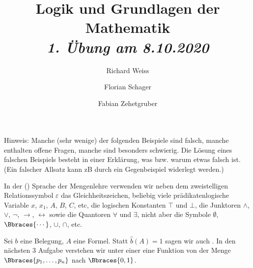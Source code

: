 \documentclass{article}
\title
{
  Logik und Grundlagen der Mathematik \\
  \vspace{4pt}
  \normalsize
  \textit{1. Übung am 8.10.2020}
}
\author
{
  Richard Weiss
  \and
  Florian Schager
  \and
  Fabian Zehetgruber
}
\date{}
\begin{document}
\maketitle

Hinweis:
Manche (sehr wenige) der folgenden Beispiele sind falsch, manche enthalten offene Fragen, manche sind besonders schwierig.
Die Lösung eines falschen Beispiels besteht in einer Erklärung, was bzw. warum etwas falsch ist.
(Ein falscher Allsatz kann zB durch ein Gegenbeispiel widerlegt werden.)




\phantom{}

In der () Sprache der Mengenlehre verwenden wir neben dem zweistelligen Relationssymbol $\varepsilon$ das Gleichheitszeichen, beliebig viele prädikatenlogische Variable $x$, $x_1$, $A$, $B$, $C$, etc, die logischen Konstanten $\top$ und $\bot$, die Junktoren $\land$, $\lor$, $\neg$, $\to$, $\leftrightarrow$ sowie die Quantoren $\forall$ und $\exists$, nicht aber die Symbole $\emptyset$, $\Bbraces{\cdots}$, $\cup$, $\cap$, etc.







\phantom{}

Sei $b$ eine Belegung, $A$ eine Formel.
Statt $\hat{b}(A) = 1$ sagen wir auch .
In den nächsten 3 Aufgabe verstehen wir unter einer  eine Funktion von der Menge $\Bbraces{p_1, \ldots, p_n}$ nach $\Bbraces{0, 1}$.



\end{document}
